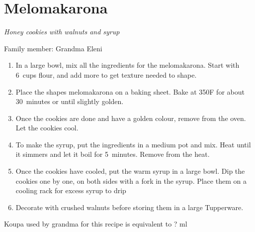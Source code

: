 \chapter{Melomakarona}
\label{ch:melomakarona}


\textit{Honey cookies with walnuts and syrup}

Family member: Grandma Eleni

\begin{enumerate}
    \item In a large bowl, mix all the ingredients for the melomakarona. Start with 6~cups flour, and add more to get texture needed to shape.
    \item Place the shapes melomakarona on a baking sheet. Bake at 350\degree F for about 30~minutes or until slightly golden.
    \item Once the cookies are done and have a golden colour, remove from the oven. Let the cookies cool. 
    \item To make the syrup, put the ingredients in a medium pot and mix. Heat until it simmers and let it boil for 5~minutes. Remove from the heat.
    \item Once the cookies have cooled, put the warm syrup in a large bowl. Dip the cookies one by one, on both sides with a fork in the syrup. Place them on a cooling rack for excess syrup to drip
    \item Decorate with crushed walnuts before storing them in a large Tupperware.
\end{enumerate}

Koupa used by grandma for this recipe is equivalent to ? ml
